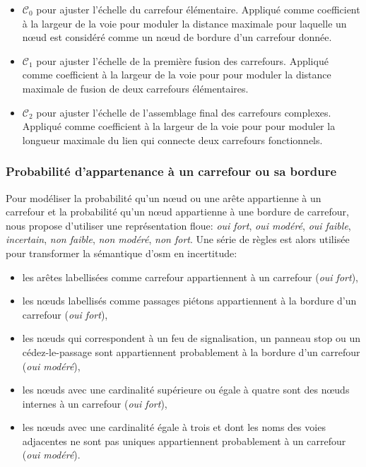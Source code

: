 \begin{itemize}
    \item $\mathcal{C}_0$ pour ajuster l'échelle du carrefour élémentaire. Appliqué comme coefficient à la largeur de la voie pour moduler la distance maximale pour laquelle un nœud est considéré comme un nœud de bordure d'un carrefour donnée.
    \item $\mathcal{C}_1$ pour ajuster l'échelle de la première fusion des carrefours. Appliqué comme coefficient à la largeur de la voie pour pour moduler la distance maximale de fusion de deux carrefours élémentaires.
    \item $\mathcal{C}_2$ pour ajuster l'échelle de l'assemblage final des carrefours complexes. Appliqué comme coefficient à la largeur de la voie pour pour moduler la longueur maximale du lien qui connecte deux carrefours fonctionnels.
\end{itemize}

\subsubsection{Probabilité d'appartenance à un carrefour ou sa bordure}

Pour modéliser la probabilité qu'un nœud ou une arête appartienne à un carrefour et la probabilité qu'un nœud appartienne à une bordure de carrefour, nous propose d'utiliser une représentation floue: \textit{oui fort}, \textit{oui modéré}, \textit{oui faible}, \textit{incertain}, \textit{non faible}, \textit{non modéré}, \textit{non fort}. Une série de règles est alors utilisée pour transformer la sémantique d'\gls{osm} en incertitude:

\begin{itemize}
    \item  les arêtes labellisées comme carrefour appartiennent à un carrefour (\textit{oui fort}),
    \item  les nœuds labellisés comme passages piétons appartiennent à la bordure d'un carrefour  (\textit{oui fort}),
    \item  les nœuds qui correspondent à un feu de signalisation, un panneau stop ou un cédez-le-passage sont appartiennent probablement à la bordure d'un carrefour (\textit{oui modéré}),
    \item  les nœuds avec une cardinalité supérieure ou égale à quatre sont des nœuds internes à un carrefour (\textit{oui fort}),
    \item  les nœuds avec une cardinalité égale à trois et dont les noms des voies adjacentes ne sont pas uniques appartiennent probablement à un carrefour (\textit{oui modéré}).
\end{itemize}

